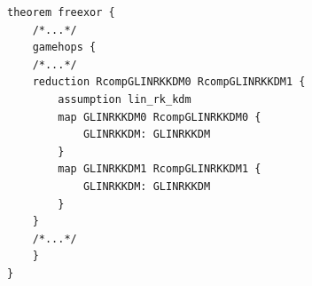 \begin{longlisting}
\begin{verbatim}
theorem freexor {
    /*...*/
    gamehops {
    /*...*/
    reduction RcompGLINRKKDM0 RcompGLINRKKDM1 {
        assumption lin_rk_kdm
        map GLINRKKDM0 RcompGLINRKKDM0 {
            GLINRKKDM: GLINRKKDM
        }
        map GLINRKKDM1 RcompGLINRKKDM1 {
            GLINRKKDM: GLINRKKDM
        }
    }
    /*...*/
    }
}
\end{verbatim}
\caption{Game hop 8 in the  theorem}
\label{lst:domino-freexor-gamehop7}
\end{longlisting}